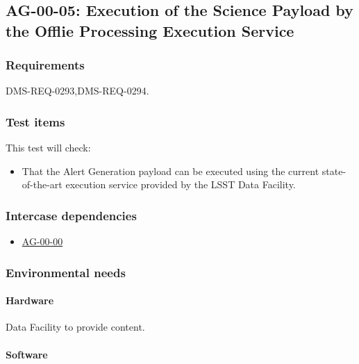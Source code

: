 \subsection{AG-00-05: Execution of the Science Payload by the Offlie
Processing Execution Service}
\label{ag-00-05}

\subsubsection{Requirements}

DMS-REQ-0293,DMS-REQ-0294.

\subsubsection{Test items}

This test will check:

\begin{itemize}

  \item{That the Alert Generation payload can be executed using the current
  state-of-the-art execution service provided by the LSST Data Facility.}

\end{itemize}

\subsubsection{Intercase dependencies}

\begin{itemize}

  \item{\hyperref[ag-00-00]{AG-00-00}}

\end{itemize}

\subsubsection{Environmental needs}

\paragraph{Hardware}

\begin{note}
Data Facility to provide content.
\end{note}

\paragraph{Software}

